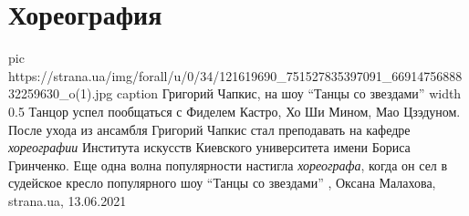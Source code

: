  
 
 
 
 
\chapter{Хореография}

\ifcmt
  pic https://strana.ua/img/forall/u/0/34/121619690_751527835397091_6691475688832259630_o(1).jpg
	caption Григорий Чапкис, на шоу \enquote{Танцы со звездами}
	width 0.5
\fi
Танцор успел пообщаться с Фиделем Кастро, Хо Ши Мином, Мао Цзэдуном.  После
ухода из ансамбля Григорий Чапкис стал преподавать на кафедре
\emph{хореографии} Института искусств Киевского университета имени Бориса
Гринченко.  Еще одна волна популярности настигла \emph{хореографа}, когда он
сел в судейское кресло популярного шоу \enquote{Танцы со звездами}
, 
Оксана Малахова, strana.ua, 13.06.2021

